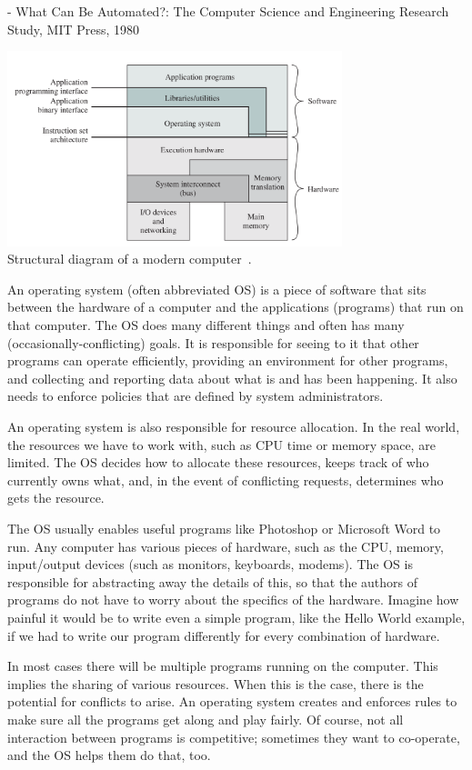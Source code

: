 \hfill - What Can Be Automated?: The Computer Science and Engineering Research Study, MIT Press, 1980

\begin{center}
\includegraphics[width=0.73\textwidth]{images/os-sw-hw.png}\\
Structural diagram of a modern computer~\cite{osi}.
\end{center}

An operating system (often abbreviated OS) is a piece of software that sits between the hardware of a computer and the applications (programs) that run on that computer. The OS does many different things and often has many (occasionally-conflicting) goals. It is responsible for seeing to it that other programs can operate efficiently, providing an environment for other programs, and collecting and reporting data about what is and has been happening. It also needs to enforce policies that are defined by system administrators.

An operating system is also responsible for resource allocation. In the real world, the resources we have to work with, such as CPU time or memory space, are limited. The OS decides how to allocate these resources, keeps track of who currently owns what, and, in the event of conflicting requests, determines who gets the resource.

The OS usually enables useful programs like Photoshop or Microsoft Word to run. Any computer has various pieces of hardware, such as the CPU, memory, input/output devices (such as monitors, keyboards, modems). The OS is responsible for abstracting away the details of this, so that the authors of programs do not have to worry about the specifics of the hardware. Imagine how painful it would be to write even a simple program, like the Hello World example, if we had to write our program differently for every combination of hardware.

In most cases there will be multiple programs running on the computer. This implies the sharing of various resources. When this is the case, there is the potential for conflicts to arise. An operating system creates and enforces rules to make sure all the programs get along and play fairly. Of course, not all interaction between programs is competitive; sometimes they want to co-operate, and the OS helps them do that, too.

